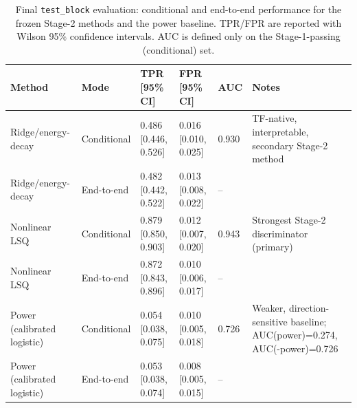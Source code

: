 \begin{table}[htbp]
    \centering
    \caption{Final \texttt{test\_block} evaluation: conditional and end-to-end performance for the frozen Stage-2 methods and the power baseline. TPR/FPR are reported with Wilson 95\% confidence intervals. AUC is defined only on the Stage-1-passing (conditional) set.}
    \label{tab:final_results}
    \begin{tabular}{@{}llllll@{}}
        \toprule
        \textbf{Method} & \textbf{Mode} & \textbf{TPR [95\% CI]} & \textbf{FPR [95\% CI]} & \textbf{AUC} & \textbf{Notes} \\
        \midrule
        Ridge/energy-decay & Conditional & 0.486 [0.446, 0.526] & 0.016 [0.010, 0.025] & 0.930 & TF-native, interpretable, secondary Stage-2 method \\
        Ridge/energy-decay & End-to-end & 0.482 [0.442, 0.522] & 0.013 [0.008, 0.022] & -- &  \\
        Nonlinear LSQ & Conditional & 0.879 [0.850, 0.903] & 0.012 [0.007, 0.020] & 0.943 & Strongest Stage-2 discriminator (primary) \\
        Nonlinear LSQ & End-to-end & 0.872 [0.843, 0.896] & 0.010 [0.006, 0.017] & -- &  \\
        Power (calibrated logistic) & Conditional & 0.054 [0.038, 0.075] & 0.010 [0.005, 0.018] & 0.726 & Weaker, direction-sensitive baseline; AUC(power)=0.274, AUC(-power)=0.726 \\
        Power (calibrated logistic) & End-to-end & 0.053 [0.038, 0.074] & 0.008 [0.005, 0.015] & -- &  \\
        \bottomrule
    \end{tabular}
\end{table}